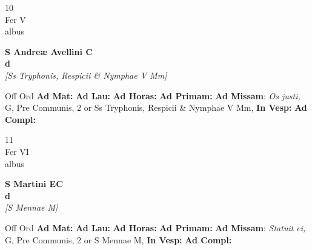 \documentclass[10pt, openany]{book}
\begin{document}
    \begin{center}
        \begin{minipage}{3.5in}
            \vspace{2em}
            \begin{minipage}{0.5in}
                {\Huge 10} \\
                {\normalsize Fer V} \\
                {\normalsize albus}
            \end{minipage}
            \begin{minipage}{3.0in}
                \textbf{ \large S Andreæ Avellini C \\
                \textnormal{\normalsize d}} \\ \textit{[Ss Tryphonis, Respicii \& Nymphae V Mm]} \\ 
            \end{minipage}
            \begin{justify}Off Ord
                \textbf{Ad Mat: }
                \textbf{Ad Lau: }
                \textbf{Ad Horas: }
                \textbf{Ad Primam: }\textbf{Ad Missam}: \textit{Os justi,} G, Pre Communis, 2 or Ss Tryphonis, Respicii \& Nymphae V Mm,  
                \textbf{In Vesp: }
                \textbf{Ad Compl: }
            \end{justify}
        \end{minipage}
    \end{center}

    \begin{center}
        \begin{minipage}{3.5in}
            \vspace{2em}
            \begin{minipage}{0.5in}
                {\Huge 11} \\
                {\normalsize Fer VI} \\
                {\normalsize albus}
            \end{minipage}
            \begin{minipage}{3.0in}
                \textbf{ \large S Martini  EC \\
                \textnormal{\normalsize d}} \\ \textit{[S Mennae M]} \\ 
            \end{minipage}
            \begin{justify}Off Ord
                \textbf{Ad Mat: }
                \textbf{Ad Lau: }
                \textbf{Ad Horas: }
                \textbf{Ad Primam: }\textbf{Ad Missam}: \textit{Statuit ei,} G, Pre Communis, 2 or S Mennae M,  
                \textbf{In Vesp: }
                \textbf{Ad Compl: }
            \end{justify}
        \end{minipage}
    \end{center}
\end{document}
